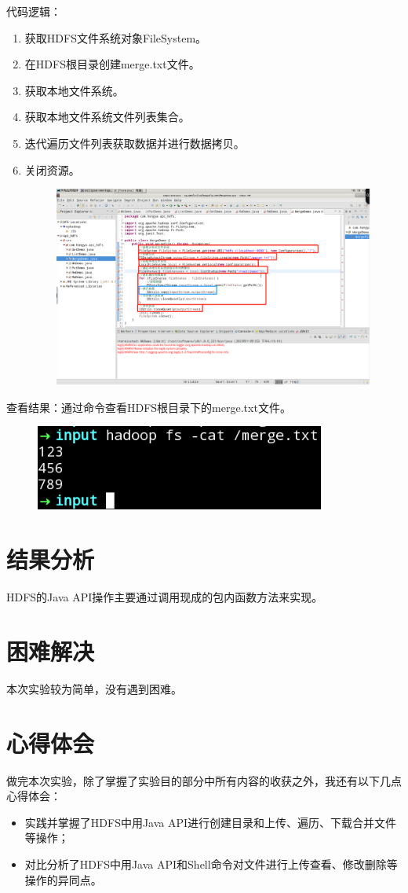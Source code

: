 \documentclass {article}
\begin{document}
				代码逻辑：
				\begin{enumerate}
					\item 获取HDFS文件系统对象FileSystem。
					\item 在HDFS根目录创建merge.txt文件。
					\item 获取本地文件系统。
					\item 获取本地文件系统文件列表集合。
					\item 迭代遍历文件列表获取数据并进行数据拷贝。
					\item 关闭资源。
					\begin{figure}[H]
						\centering
						\includegraphics[width=4.5in]{figures/fig31.png}
					\end{figure}
				\end{enumerate}
			
				查看结果：通过命令查看HDFS根目录下的merge.txt文件。
				\begin{figure}[H]
					\centering
					\includegraphics{figures/fig32.png}
				\end{figure}
	
	\section{结果分析}
		HDFS的Java API操作主要通过调用现成的包内函数方法来实现。
					
	\section{困难解决}
		本次实验较为简单，没有遇到困难。
	
	\section{心得体会}
		做完本次实验，除了掌握了实验目的部分中所有内容的收获之外，我还有以下几点心得体会：
		\begin{itemize}
			\item 实践并掌握了HDFS中用Java API进行创建目录和上传、遍历、下载合并文件等操作；
			\item 对比分析了HDFS中用Java API和Shell命令对文件进行上传查看、修改删除等操作的异同点。
		\end{itemize}
	
\end{document}
